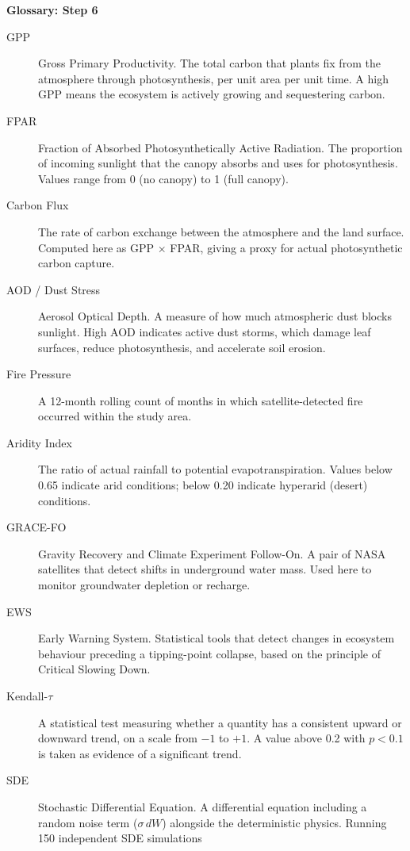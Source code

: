\documentclass[12pt, a4paper]{article}
\begin{document}
\begin{mdframed}[style=keybox]
\textbf{Glossary: Step 6}\\[6pt]
\begin{description}
    \item[GPP] Gross Primary Productivity. The total carbon that plants
    fix from the atmosphere through photosynthesis, per unit area per unit
    time. A high GPP means the ecosystem is actively growing and
    sequestering carbon.
    \item[FPAR] Fraction of Absorbed Photosynthetically Active Radiation.
    The proportion of incoming sunlight that the canopy absorbs and uses
    for photosynthesis. Values range from 0 (no canopy) to 1 (full canopy).
    \item[Carbon Flux] The rate of carbon exchange between the atmosphere
    and the land surface. Computed here as GPP $\times$ FPAR, giving a
    proxy for actual photosynthetic carbon capture.
    \item[AOD / Dust Stress] Aerosol Optical Depth. A measure of how much
    atmospheric dust blocks sunlight. High AOD indicates active dust
    storms, which damage leaf surfaces, reduce photosynthesis, and
    accelerate soil erosion.
    \item[Fire Pressure] A 12-month rolling count of months in which
    satellite-detected fire occurred within the study area.
    \item[Aridity Index] The ratio of actual rainfall to potential
    evapotranspiration. Values below 0.65 indicate arid conditions; below
    0.20 indicate hyperarid (desert) conditions.
    \item[GRACE-FO] Gravity Recovery and Climate Experiment Follow-On.
    A pair of NASA satellites that detect shifts in underground water
    mass. Used here to monitor groundwater depletion or recharge.
    \item[EWS] Early Warning System. Statistical tools that detect changes
    in ecosystem behaviour preceding a tipping-point collapse, based on
    the principle of Critical Slowing Down.
    \item[Kendall-$\tau$] A statistical test measuring whether a quantity
    has a consistent upward or downward trend, on a scale from $-1$ to
    $+1$. A value above 0.2 with $p < 0.1$ is taken as evidence of a
    significant trend.
    \item[SDE] Stochastic Differential Equation. A differential equation
    including a random noise term ($\sigma\,dW$) alongside the
    deterministic physics. Running 150 independent SDE simulations

\end{description}
\end{mdframed}
\end{document}

